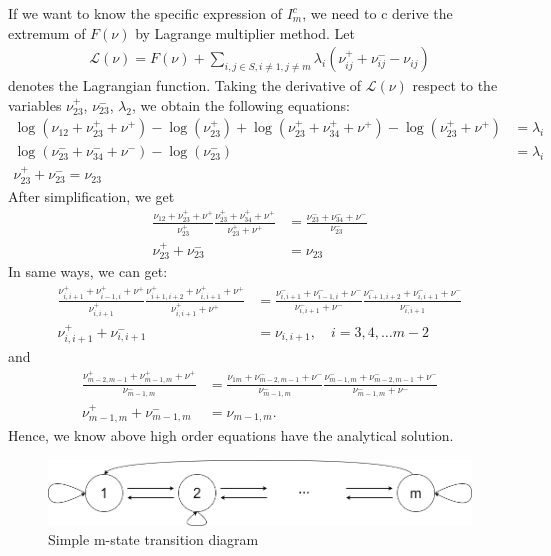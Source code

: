 \documentclass[11pt,en,cite=authoryear]{elegantpaper}
\begin{document}
If we want to know the specific expression of $I_m^c$, we need to c
derive the extremum of $F(\nu)$ by Lagrange multiplier method.
Let 
\begin{align*}
    \mathcal{L}(\nu) = F(\nu) + \sum_{i,j \in S, i\neq 1, j\neq m} \lambda_i (\nu^+_{ij} + \nu^-_{ij} - \nu_{ij})
\end{align*}
denotes the Lagrangian function.
Taking the derivative of $\mathcal{L}(\nu)$ respect to the variables $\nu^+_{23}$, $\nu^-_{23}$, $\lambda_2$,
we obtain the following equations:
\begin{align*}
    \log(\nu_{12}+\nu^{+}_{23}+\nu^{+}) - \log(\nu^{+}_{23}) + \log(\nu^{+}_{23}+\nu^{+}_{34}+\nu^{+}) - \log(\nu^{+}_{23}+\nu^{+}) &= \lambda_i \\
    \log(\nu^{-}_{23}+\nu^{-}_{34}+\nu^{-}) - \log(\nu^{-}_{23}) &= \lambda_i \\
    \nu^+_{23} + \nu^-_{23} = \nu_{23}
\end{align*}
After simplification, we get 
\begin{align*}
    \frac{\nu_{12}+\nu^{+}_{23}+\nu^{+}}{\nu^{+}_{23}} \frac{\nu^{+}_{23}+\nu^{+}_{34}+\nu^{+}}{\nu^{+}_{23}+\nu^{+}}
    &= \frac{\nu^{-}_{23}+\nu^{-}_{34}+\nu^{-}}{\nu^{-}_{23}} \\
    \nu^+_{23} + \nu^-_{23} &= \nu_{23}
\end{align*}
In same ways, we can get:
\begin{align*}
    \frac{\nu^{+}_{i,i+1}+\nu^{+}_{i-1,i}+\nu^+}{\nu^{+}_{i,i+1}}
    \frac{\nu^{+}_{i+1, i+2}+\nu^{+}_{i,i+1}+\nu^+}{\nu^{+}_{i,i+1}+\nu^+}
    &= \frac{\nu^{-}_{i,i+1}+\nu^{-}_{i-1,i}+\nu^-}{\nu^{-}_{i,i+1}+\nu^-}
    \frac{\nu^{-}_{i+1, i+2}+\nu^{-}_{i,i+1}+\nu^-}{\nu^{-}_{i,i+1}}\\
    \nu^+_{i,i+1} + \nu^-_{i,i+1} &= \nu_{i,i+1}, \quad
    i = 3,4, \dots m-2
\end{align*}
and
\begin{align*}
    \frac{\nu^{+}_{m-2,m-1}+\nu^{+}_{m-1,m}+\nu^{+}}{\nu^{-}_{m-1,m}}
    &=\frac{\nu_{1m}+\nu^{-}_{m-2,m-1}+\nu^{-}}{\nu^{-}_{m-1,m}}
    \frac{\nu^{-}_{m-1,m}+\nu^{-}_{m-2,m-1}+\nu^{-}}{\nu^{-}_{m-1,m}+\nu^{-}} \\
    \nu^+_{m-1,m} + \nu^-_{m-1,m} &= \nu_{m-1,m}.
\end{align*}
Hence, we know above high order equations have the analytical solution.


\begin{figure}[h]
    \centering
    \includegraphics[scale=0.3]{chart/n-state.png}
    \caption{Simple m-state transition diagram}
\end{figure}
\end{document}
